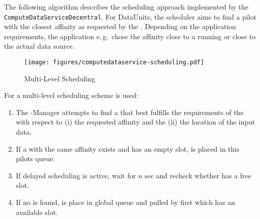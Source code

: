 \documentclass{sig-alternate}
\begin{document}
The following algorithm describes the scheduling approach implemented by the 
\texttt{ComputeDataServiceDecentral}. For DataUnits, the scheduler aims to 
find a pilot with the closest affinity as requested by the \dataunit. 
Depending on the application requirements, the application e.\,g.\ chose the affinity close to a running \pilotcompute or close to the actual data source.
\begin{figure}[htbp]
	\centering
	\texttt{[image: figures/computedataservice-scheduling.pdf]}
	\caption{Multi-Level Scheduling}
	\label{fig:figures_computedataservice-scheduling}
\end{figure}

For \computeunits a multi-level scheduling scheme is used:
\begin{enumerate}
	\item The \pilot-Manager attempts to find a \pilot that best fulfills the 
	requirements of the \cu with respect to (i) the requested affinity and the 
	(ii) the location of the input data.
	\item If a \pilot with the same affinity exists and \pilot has an empty 
	slot, \cu is placed in this pilots queue.
	\item If delayed scheduling is active, wait for $n$ sec and recheck 
	whether \pilot has a free slot.
	\item If no \pilot is found, \cu is place in global queue and pulled by 	
	first \pilot which has an available slot.	
\end{enumerate}
\end{document}
